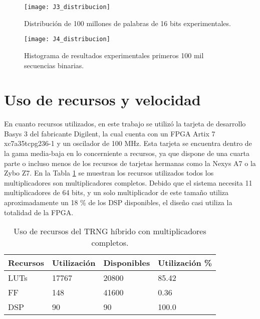         \begin{figure}[hbtp]
            \caption{Distribución de 100 millones de palabras de 16 bits experimentales.}
            \centering
            \texttt{[image: J3\_distribucion]}
            \label{fig:J3_distribucion}
        \end{figure}


        \begin{figure}[hbtp]
            \caption{Histograma de resultados experimentales primeros 100 mil secuencias binarias.}
            \centering
            \texttt{[image: J4\_distribucion]}
            \label{fig:J4_distribucion}
        \end{figure}



    \section{Uso de recursos y velocidad}

        En cuanto recursos utilizados, en este trabajo se utilizó la tarjeta de desarrollo Basys 3 del fabricante Digilent, la cual cuenta con un FPGA Artix 7 xc7a35tcpg236-1 y un oscilador de 100 MHz. Esta tarjeta se encuentra dentro de la gama media-baja en lo concerniente a recursos, ya que dispone de una cuarta parte o incluso menos de los recursos de tarjetas hermanas como la Nexys A7 o la Zybo Z7. En la Tabla \ref{tab:recursos} se muestran los recursos utilizados todos los multiplicadores son multiplicadores completos. Debido que el sistema necesita 11 multiplicadores de 64 bits, y un solo multiplicador de este tamaño utiliza aproximadamente un 18 \% de los DSP disponibles, el diseño casi utiliza la totalidad de la FPGA. 

        \begin{table}[htbp]
            \centering
            \caption{Uso de recursos del TRNG híbrido con multiplicadores completos.}
            \begin{tabular}{|l|l|l|l|}
                \hline
                \rowcolor{lightgray} Recursos  & Utilización & Disponibles & Utilización \% \\
                \hline
                LUTs      & 17767  & 20800    & 85.42  \\
                \hline
                FF     &  148 & 41600   & 0.36 \\
                \hline
                DSP       & 90  & 90   & 100.0 \\
                \hline
            \end{tabular}
            \label{tab:recursos}
        \end{table}

